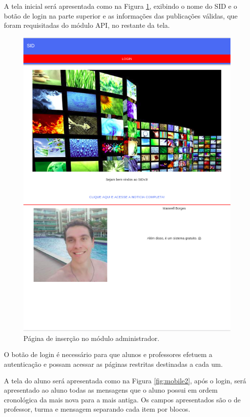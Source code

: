 A tela inicial será apresentada como na Figura \ref{fig:mobile1}, exibindo o nome do SID e o botão de login na parte superior e as informações das publicações válidas, que foram requisitadas do módulo API, no restante da tela.
\begin{figure}[H]
\centering
\includegraphics[scale=0.5]{figuras/mobile1}
\caption{Página de inserção no módulo administrador.}
\label{fig:mobile1}
\end{figure}



O botão de login é necessário para que alunos e professores efetuem a autenticação e possam acessar as páginas restritas destinadas a cada um.

A tela do aluno será apresentada como na Figura \ref{fig:mobile2}, após o login, será apresentado ao aluno todas as mensagens que o aluno possui em ordem cronológica da mais nova para a mais antiga. Os campos apresentados são o de professor, turma e mensagem separando cada item por blocos.

